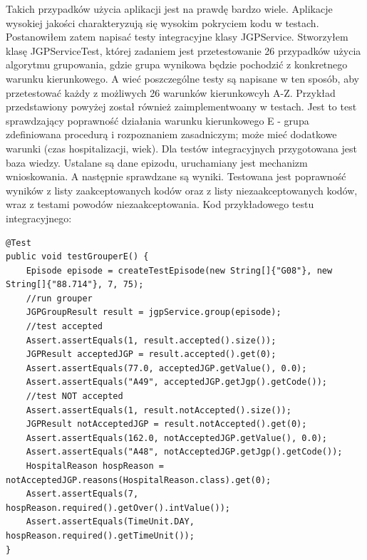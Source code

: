 Takich przypadków użycia aplikacji jest na prawdę bardzo wiele. Aplikacje wysokiej jakości charakteryzują się wysokim pokryciem kodu w testach. Postanowiłem zatem napisać testy integracyjne klasy JGPService. Stworzyłem klasę JGPServiceTest, której zadaniem jest przetestowanie 26 przypadków użycia algorytmu grupowania, gdzie grupa wynikowa będzie pochodzić z konkretnego warunku kierunkowego. A wieć poszczególne testy są napisane w ten sposób, aby przetestować każdy z możliwych 26 warunków kierunkowcyh A-Z.
Przykład przedstawiony powyżej został również zaimplementwoany w testach. Jest to test sprawdzający poprawność działania warunku kierunkowego E - grupa zdefiniowana procedurą i rozpoznaniem zasadniczym; może mieć dodatkowe warunki (czas hospitalizacji, wiek).
Dla testów integracyjnych przygotowana jest baza wiedzy. Ustalane są dane epizodu, uruchamiany jest mechanizm wnioskowania. A następnie sprawdzane są wyniki. Testowana jest poprawność wyników z listy zaakceptowanych kodów oraz z listy niezaakceptowanych kodów, wraz z testami powodów niezaakceptowania.
Kod przykładowego testu integracyjnego:
\begin{verbatim}
@Test
public void testGrouperE() {
    Episode episode = createTestEpisode(new String[]{"G08"}, new String[]{"88.714"}, 7, 75);
    //run grouper
    JGPGroupResult result = jgpService.group(episode);
    //test accepted
    Assert.assertEquals(1, result.accepted().size());
    JGPResult acceptedJGP = result.accepted().get(0);
    Assert.assertEquals(77.0, acceptedJGP.getValue(), 0.0);
    Assert.assertEquals("A49", acceptedJGP.getJgp().getCode());
    //test NOT accepted
    Assert.assertEquals(1, result.notAccepted().size());
    JGPResult notAcceptedJGP = result.notAccepted().get(0);
    Assert.assertEquals(162.0, notAcceptedJGP.getValue(), 0.0);
    Assert.assertEquals("A48", notAcceptedJGP.getJgp().getCode());
    HospitalReason hospReason = notAcceptedJGP.reasons(HospitalReason.class).get(0);
    Assert.assertEquals(7, hospReason.required().getOver().intValue());
    Assert.assertEquals(TimeUnit.DAY, hospReason.required().getTimeUnit());
}
\end{verbatim}

